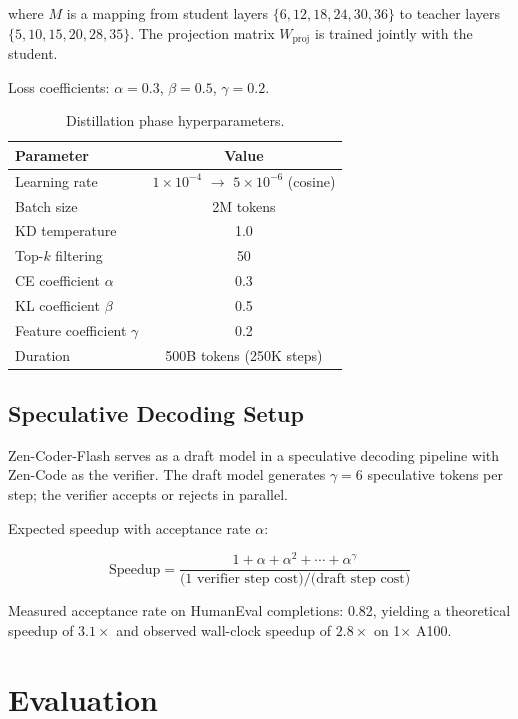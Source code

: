 \documentclass[11pt,a4paper]{article}
\begin{document}
where $M$ is a mapping from student layers $\{6, 12, 18, 24, 30, 36\}$ to teacher layers
$\{5, 10, 15, 20, 28, 35\}$. The projection matrix $W_{\text{proj}}$ is trained jointly
with the student.

Loss coefficients: $\alpha = 0.3$, $\beta = 0.5$, $\gamma = 0.2$.

\begin{table}[H]
\centering
\caption{Distillation phase hyperparameters.}
\label{tab:kd}
\begin{tabular}{lc}
\toprule
\textbf{Parameter} & \textbf{Value} \\
\midrule
Learning rate      & $1 \times 10^{-4}$ $\to$ $5 \times 10^{-6}$ (cosine) \\
Batch size         & 2M tokens \\
KD temperature     & 1.0 \\
Top-$k$ filtering  & 50 \\
CE coefficient $\alpha$ & 0.3 \\
KL coefficient $\beta$  & 0.5 \\
Feature coefficient $\gamma$ & 0.2 \\
Duration           & 500B tokens (250K steps) \\
\bottomrule
\end{tabular}
\end{table}

\subsection{Speculative Decoding Setup}

Zen-Coder-Flash serves as a draft model in a speculative decoding pipeline with Zen-Code
as the verifier. The draft model generates $\gamma = 6$ speculative tokens per step;
the verifier accepts or rejects in parallel.

Expected speedup with acceptance rate $\alpha$:

\begin{equation}
  \text{Speedup} = \frac{1 + \alpha + \alpha^2 + \cdots + \alpha^\gamma}{\text{(1 verifier step cost)} / \text{(draft step cost)}}
\end{equation}

Measured acceptance rate on HumanEval completions: 0.82, yielding a theoretical speedup
of $3.1\times$ and observed wall-clock speedup of $2.8\times$ on 1$\times$ A100.

\section{Evaluation}
\end{document}
